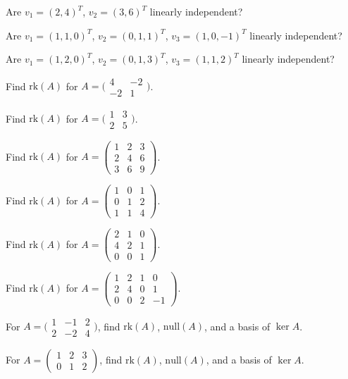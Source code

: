 \begin{problems}
    \item Are $v_{1} = (2, 4)^{T}$, $v_{2} = (3, 6)^{T}$ linearly independent?
    \item Are $v_{1} = (1, 1, 0)^{T}$, $v_{2} = (0, 1, 1)^{T}$, $v_{3} = (1, 0, -1)^{T}$ linearly independent?
    \item Are $v_{1} = (1, 2, 0)^{T}$, $v_{2} = (0, 1, 3)^{T}$, $v_{3} = (1, 1, 2)^{T}$ linearly independent?
    \item Find $\mathrm{rk}(A)$ for $A = \bigl(\begin{smallmatrix} 4 & -2 \\ -2 & 1 \end{smallmatrix}\bigr)$.
    \item Find $\mathrm{rk}(A)$ for $A = \bigl(\begin{smallmatrix} 1 & 3 \\ 2 & 5 \end{smallmatrix}\bigr)$.
    \item Find $\mathrm{rk}(A)$ for $A = \begin{pmatrix} 1 & 2 & 3 \\ 2 & 4 & 6 \\ 3 & 6 & 9 \end{pmatrix}$.
    \item Find $\mathrm{rk}(A)$ for $A = \begin{pmatrix} 1 & 0 & 1 \\ 0 & 1 & 2 \\ 1 & 1 & 4 \end{pmatrix}$.
    \item Find $\mathrm{rk}(A)$ for $A = \begin{pmatrix} 2 & 1 & 0 \\ 4 & 2 & 1 \\ 0 & 0 & 1 \end{pmatrix}$.
    \item Find $\mathrm{rk}(A)$ for $A = \begin{pmatrix} 1 & 2 & 1 & 0 \\ 2 & 4 & 0 & 1 \\ 0 & 0 & 2 & -1 \end{pmatrix}$.
    \item For $A = \bigl(\begin{smallmatrix} 1 & -1 & 2 \\ 2 & -2 & 4 \end{smallmatrix}\bigr)$, find $\mathrm{rk}(A)$, $\mathrm{null}(A)$, and a basis of $\ker A$.
    \item For $A = \begin{pmatrix} 1 & 2 & 3 \\ 0 & 1 & 2 \end{pmatrix}$, find $\mathrm{rk}(A)$, $\mathrm{null}(A)$, and a basis of $\ker A$.

\end{problems}
